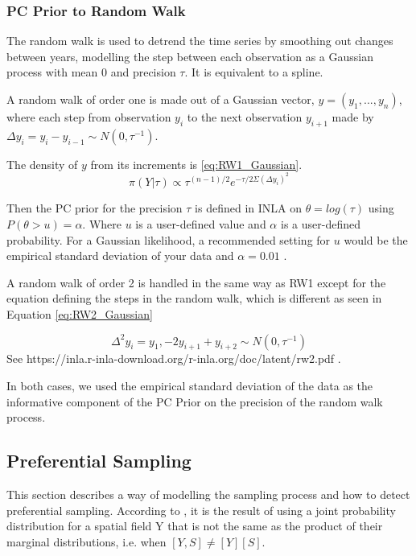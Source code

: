 \subsubsection*{PC Prior to Random Walk}
\label{subsubsec:pconranwalk}
The random walk is used to detrend the time series by smoothing out changes between years, modelling the step between each observation as a Gaussian process with mean 0 and precision $\tau$.  It is equivalent to a spline.

A random walk of order one is made out of a Gaussian vector, 
$y = (y_1, ..., y_n)$,  where each step from observation $y_i$ to the next observation $y_{i+1}$ made by $\Delta y_i = y_i - y_{i-1} \sim N(0, \tau^{-1})$.  

The density of $y$ from its increments is \ref{eq:RW1_Gaussian}.
\begin{equation} \label{eq:RW1_Gaussian}
\pi (Y|\tau) \propto \tau^{(n-1)/2} e^{-\tau/2 \Sigma (\Delta y_i)^2} 
\end{equation}


Then the \ac{PC} prior for the precision $\tau$ is defined in \ac{INLA} on $\theta = log(\tau)$ using $P(\theta > u) = \alpha$.  Where $u$ is a user-defined value and $\alpha$ is a user-defined probability.  For a Gaussian likelihood, a recommended setting for $u$ would be the empirical standard deviation of your data and $\alpha =0.01$  \citep{gomezGitBook}.


A random walk of order 2 is handled in the same way as RW1 except for the equation defining the steps in the random walk, which is different as seen in Equation \ref{eq:RW2_Gaussian}

\begin{equation} \label{eq:RW2_Gaussian}
\Delta^2 y_i = y_1, - 2y_{i+1} + y_{i+2} \sim N(0,\tau^{-1})
\end{equation}
See 
https://inla.r-inla-download.org/r-inla.org/doc/latent/rw2.pdf
.

In both cases, we used the empirical standard deviation of the data as the informative component of the PC Prior on the precision of the random walk process.










\subsection{Preferential Sampling} \label{subsec:PreferentialSampling}
This section describes a way of modelling the sampling process and how to detect preferential sampling. 
According to 
\citet{diggle:07}, it is the result of using a joint probability distribution for a spatial field \gls{Y} that is not the same as the product of their marginal distributions, i.e. when $[Y, S] \neq [Y][S]$.  

